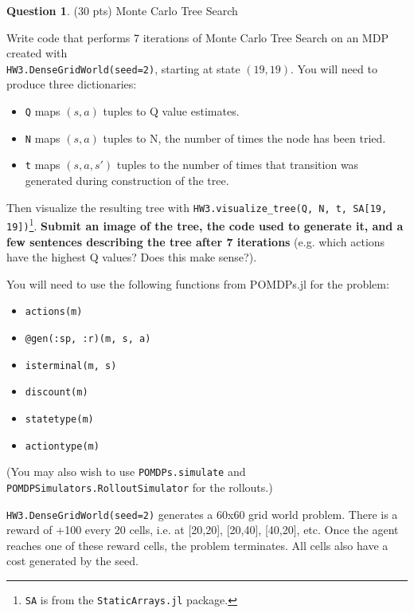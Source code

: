 \documentclass{article}
\theoremstyle{definition}
\newtheorem{question}[thm]{Question}
\begin{document}
\begin{question}\label{q:mcts}
    (30 pts) Monte Carlo Tree Search
    
    Write code that performs 7 iterations of Monte Carlo Tree Search on an MDP created with \\
    \texttt{HW3.DenseGridWorld(seed=2)},
    starting at state $(19, 19)$. You will need to produce three dictionaries:
    \begin{itemize}[noitemsep]
        \item \texttt{Q} maps $(s, a)$ tuples to Q value estimates.
        \item \texttt{N} maps $(s, a)$ tuples to N, the number of times the node has been tried.
        \item \texttt{t} maps $(s, a, s')$ tuples to the number of times that transition was generated during construction of the tree.
    \end{itemize}
    Then visualize the resulting tree with \texttt{HW3.visualize\_tree(Q, N, t, SA[19, 19])}\footnote{\texttt{SA} is from the \texttt{StaticArrays.jl} package.}. \textbf{Submit an image of the tree, the code used to generate it, and a few sentences describing the tree after 7 iterations} (e.g. which actions have the highest Q values? Does this make sense?).
    
    You will need to use the following functions from POMDPs.jl for the problem:
    \begin{itemize}[noitemsep]
        \item \texttt{actions(m)}
        \item \texttt{@gen(:sp, :r)(m, s, a)}
        \item \texttt{isterminal(m, s)}
        \item \texttt{discount(m)}
        \item \texttt{statetype(m)}
        \item \texttt{actiontype(m)}
    \end{itemize}
    (You may also wish to use \texttt{POMDPs.simulate} and \texttt{POMDPSimulators.RolloutSimulator} for the rollouts.)

    \texttt{HW3.DenseGridWorld(seed=2)} generates a 60x60 grid world problem. There is a reward of +100 every 20 cells, i.e. at [20,20], [20,40], [40,20], etc. Once the agent reaches one of these reward cells, the problem terminates. All cells also have a cost generated by the seed.
\end{question}
\end{document}

